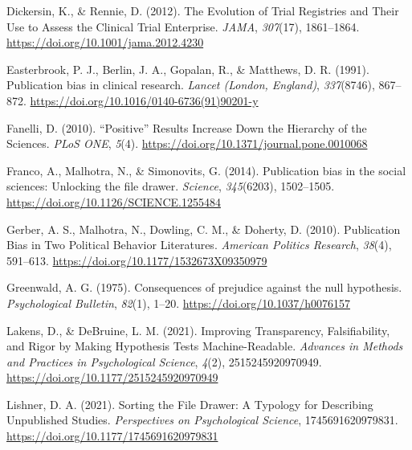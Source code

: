 \documentclass[
  ,jou, a4paper,floatsintext]{apa6}
\newlength{\cslhangindent}
\newlength{\cslentryspacingunit} %
\newenvironment{CSLReferences}[2] %
 {%
  \setlength{\parindent}{0pt}
  \ifodd #1
  \let\oldpar\par
  \def\par{\hangindent=\cslhangindent\oldpar}
  \fi
  \setlength{\parskip}{#2\cslentryspacingunit}
 }%
 {}
\begin{document}
\begin{CSLReferences}{1}{0}
\leavevmode{}%
Dickersin, K., \& Rennie, D. (2012). The {Evolution} of {Trial Registries} and {Their Use} to {Assess} the {Clinical Trial Enterprise}. \emph{JAMA}, \emph{307}(17), 1861--1864. \url{https://doi.org/10.1001/jama.2012.4230}

\leavevmode{}%
Easterbrook, P. J., Berlin, J. A., Gopalan, R., \& Matthews, D. R. (1991). Publication bias in clinical research. \emph{Lancet (London, England)}, \emph{337}(8746), 867--872. \url{https://doi.org/10.1016/0140-6736(91)90201-y}

\leavevmode{}%
Fanelli, D. (2010). {``{Positive}''} {Results Increase Down} the {Hierarchy} of the {Sciences}. \emph{PLoS ONE}, \emph{5}(4). \url{https://doi.org/10.1371/journal.pone.0010068}

\leavevmode{}%
Franco, A., Malhotra, N., \& Simonovits, G. (2014). Publication bias in the social sciences: {Unlocking} the file drawer. \emph{Science}, \emph{345}(6203), 1502--1505. \url{https://doi.org/10.1126/SCIENCE.1255484}

\leavevmode{}%
Gerber, A. S., Malhotra, N., Dowling, C. M., \& Doherty, D. (2010). Publication {Bias} in {Two Political Behavior Literatures}. \emph{American Politics Research}, \emph{38}(4), 591--613. \url{https://doi.org/10.1177/1532673X09350979}

\leavevmode{}%
Greenwald, A. G. (1975). Consequences of prejudice against the null hypothesis. \emph{Psychological Bulletin}, \emph{82}(1), 1--20. \url{https://doi.org/10.1037/h0076157}

\leavevmode{}%
Lakens, D., \& DeBruine, L. M. (2021). Improving {Transparency}, {Falsifiability}, and {Rigor} by {Making Hypothesis Tests Machine-Readable}. \emph{Advances in Methods and Practices in Psychological Science}, \emph{4}(2), 2515245920970949. \url{https://doi.org/10.1177/2515245920970949}

\leavevmode{}%
Lishner, D. A. (2021). Sorting the {File Drawer}: {A Typology} for {Describing Unpublished Studies}. \emph{Perspectives on Psychological Science}, 1745691620979831. \url{https://doi.org/10.1177/1745691620979831}


\end{CSLReferences}
\end{document}
